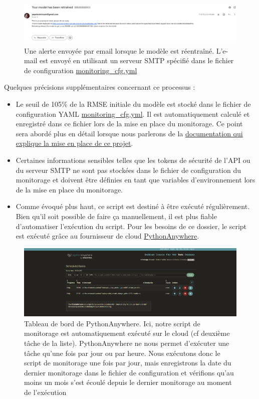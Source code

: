 \documentclass[french]{article}
\begin{document}
    \begin{figure}[h]
        \includegraphics[width=12cm]{email_alert}
        \centering
        \caption{Une alerte envoyée par email lorsque le modèle est réentraîné. L'e-mail est envoyé en utilisant un serveur SMTP spécifié dans le fichier de configuration \href{https://github.com/vinpap/predict_climate_change/blob/main/monitoring_cfg.yml}{monitoring\_cfg.yml}}
        \centering
    \end{figure}
    Quelques précisions supplémentaires concernant ce processus :
    \begin{itemize}
        \item Le seuil de 105\% de la RMSE initiale du modèle est stocké dans le fichier de configuration YAML \href{https://github.com/vinpap/predict_climate_change/blob/main/monitoring_cfg.yml}{monitoring\_cfg.yml}. Il est automatiquement calculé et enregistré dans ce fichier lors de la mise en place du monitorage. Ce point sera abordé plus en détail lorsque nous parlerons de la \hyperref[sec:deployment]{documentation qui explique la mise en place de ce projet}.
        \item Certaines informations sensibles telles que les tokens de sécurité de l'API ou du serveur SMTP ne sont pas stockées dans le fichier de configuration du monitorage et doivent être définies en tant que variables d'environnement lors de la mise en place du monitorage.
        \item Comme évoqué plus haut, ce script est destiné à être exécuté régulièrement. Bien qu'il soit possible de faire ça manuellement, il est plus fiable d'automatiser l'exécution du script. Pour les besoins de ce dossier, le script est exécuté grâce au fournisseur de cloud \href{https://www.pythonanywhere.com/}{PythonAnywhere}.
    \end{itemize}
    \begin{figure}[h]
        \includegraphics[width=12cm]{python_anywhere}
        \centering
        \caption{Tableau de bord de PythonAnywhere. Ici, notre script de monitorage est automatiquement exécuté sur le cloud (cf deuxième tâche de la liste). PythonAnywhere ne nous permet d'exécuter une tâche qu'une fois par jour ou par heure. Nous exécutons donc le script de monitorage une fois par jour, mais enregistrons la date du dernier monitorage dans le fichier de configuration et vérifions qu'au moins un mois s'est écoulé depuis le dernier monitorage au moment de l'exécution}
        \centering
    \end{figure}
\end{document}
